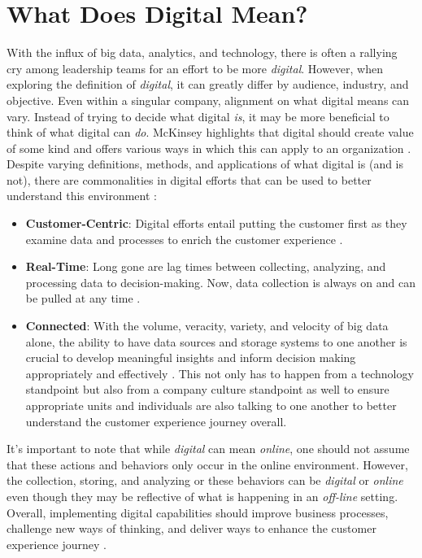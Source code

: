 \documentclass[sigconf]{acmart}
\begin{document}
\section{What Does Digital Mean?}
With the influx of big data, analytics, and technology, there is often a rallying cry among leadership teams for an effort to be more \textit{digital}. However, when exploring the definition of \textit{digital}, it can greatly differ by audience, industry, and objective. Even within a singular company, alignment on what digital means can vary. Instead of trying to decide what digital \textit{is}, it may be more beneficial to think of what digital can \textit{do}. McKinsey highlights that digital should create value of some kind and offers various ways in which this can apply to an organization \cite{Dorner2015}. Despite varying definitions, methods, and applications of what digital is (and is not), there are commonalities in digital efforts that can be used to better understand this environment \cite{Hmeid2017}:
\begin{itemize}
  \item \textbf{Customer-Centric}: Digital efforts entail putting the customer first as they examine data and processes to enrich the customer experience \cite{Hmeid2017}. 
  \item \textbf{Real-Time}: Long gone are lag times between collecting, analyzing, and processing data to decision-making. Now, data collection is always on and can be pulled at any time \cite{Hmeid2017}. 
  \item \textbf{Connected}: With the volume, veracity, variety, and velocity of big data alone, the ability to have data sources and storage systems  to one another is crucial to develop meaningful insights and inform decision making appropriately and effectively \cite{Accenture2013}. This not only has to happen from a technology standpoint but also from a company culture standpoint as well to ensure appropriate units and individuals are also talking to one another to better understand the customer experience journey overall. 
\end{itemize} 
It's important to note that while \textit{digital} can mean \textit{online}, one should not assume that these actions and behaviors only occur in the online environment. However, the collection, storing, and analyzing or these behaviors can be \textit{digital} or \textit{online} even though they may be reflective of what is happening in an \textit{off-line} setting. Overall, implementing digital capabilities should improve business processes, challenge new ways of thinking, and deliver ways to enhance the customer experience journey \cite{Accenture2013}. 
\end{document}
